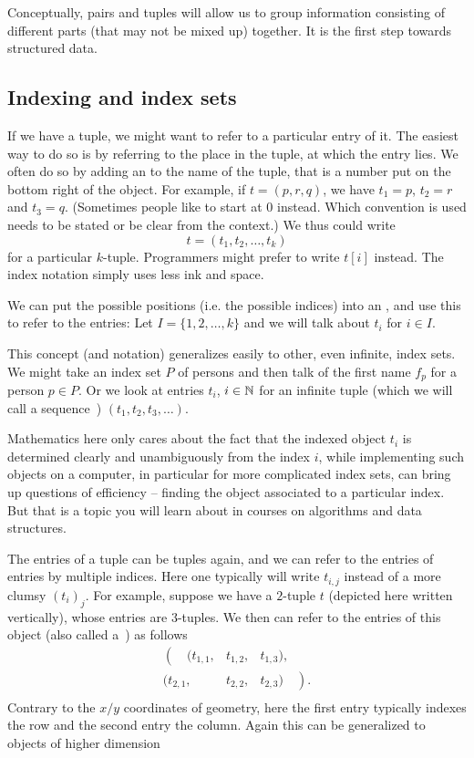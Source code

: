 Conceptually, pairs and tuples will allow us to group information consisting
of different parts (that may not be mixed up) together. It is the first step
towards structured data.

\subsection{Indexing and index sets}

If we have a tuple, we might want to refer to a
particular entry of it. The easiest way to do so is by referring to the
place in the tuple, at which the entry lies. We often do so by adding an
 to the name of the tuple, 
that is a number put on the bottom right of the object. For
example, if $t=(p,r,q)$, we have $t_1=p$, $t_2=r$ and $t_3=q$. (Sometimes
people like to start at $0$ instead. Which convention is used needs to be
stated or be clear from the context.) We thus could write 
\[
t=(t_1,t_2,\ldots,t_k)
\]
for a particular $k$-tuple. Programmers might prefer to write $t[i]$ instead. The
index notation simply uses less ink and space.
\smallskip

We can put the possible positions (i.e. the possible indices) into an 
, and use this to refer to the entries: Let
$I=\{1,2,\ldots,k\}$ and we will talk about $t_i$
for $i\in I$.  
\smallskip

This concept (and notation) generalizes easily to other, even infinite, index
sets. We might take an index set $P$ of persons and then talk of the first
name $f_p$ for a person $p\in P$. Or we look at entries $t_i$, $i\in{\mathbb N}$ for
an infinite tuple (which we will call a sequence~)
$(t_1,t_2,t_3,\ldots)$.

Mathematics here only cares about the fact that the indexed object $t_i$ is
determined clearly and unambiguously from the index $i$, while implementing
such objects on a computer, in particular for more complicated index sets,
can bring up questions of efficiency -- finding the object associated to a
particular index.  But that is a topic you will learn about in courses on
algorithms and data structures.
\medskip

The entries of a tuple can be tuples again, and we can refer to the entries
of entries by multiple indices. Here one typically will write $t_{i,j}$
instead of a more clumsy $(t_i)_j$.
For example, suppose we have a $2$-tuple $t$
(depicted here written vertically), whose entries are $3$-tuples. We then
can refer to the entries of this object (also called a~) as
follows
\[
\begin{array}{rcl}
\left(\quad(t_{1,1},\right.&t_{1,2},&t_{1,3}),\\
(t_{2,1},&t_{2,2},&t_{2,3})\left.\quad\right).\\
\end{array}
\]
Contrary to the $x/y$ coordinates of geometry, here the first entry
typically indexes the row and the second entry the column. Again this can
be generalized to objects of higher dimension


